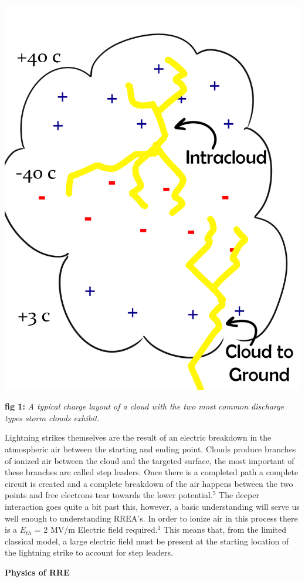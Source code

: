 \documentclass[11pt]{article}
\begin{document}
    \begin{center}
        \includegraphics[width=.5\linewidth]{clouds.png}
    \end{center}
    \textbf{fig 1:} \textit{A typical charge layout of a cloud with the two most common discharge types storm clouds exhibit.}


    Lightning strikes themselves are the result of an electric breakdown in the atmospheric air between the starting and ending point. Clouds produce branches of ionized air between the cloud and the targeted surface, the most important of these branches are called step leaders. Once there is a completed path a complete circuit is created and a complete breakdown of the air happens between the two points and free electrons tear towards the lower potential.$^{5}$ The deeper interaction goes quite a bit past this, however, a basic understanding will serve us well enough to understanding RREA's. In order to ionize air in this process there is a $E_{th}$ = 2 MV/m Electric field required.${^1}$ This means that, from the limited classical model, a large electric field must be present at the starting location of the lightning strike to account for step leaders. 
    \newline
    

    \noindent
{\bf \LARGE Physics of RRE}
    
\end{document}
